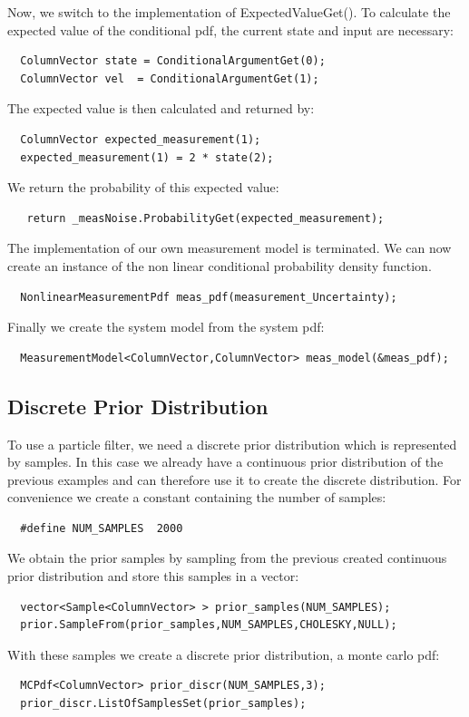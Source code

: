 \documentclass[a4paper,10pt]{report}
\begin{document}
Now, we switch to the implementation of ExpectedValueGet().  To
calculate the expected value of the conditional pdf, the current state
and input are necessary:
\begin{verbatim}
  ColumnVector state = ConditionalArgumentGet(0);
  ColumnVector vel  = ConditionalArgumentGet(1);
\end{verbatim}
The expected value is then calculated and returned by:
\begin{verbatim}
  ColumnVector expected_measurement(1);
  expected_measurement(1) = 2 * state(2);
\end{verbatim}
We return the probability of this expected value:
\begin{verbatim}
   return _measNoise.ProbabilityGet(expected_measurement);
\end{verbatim}
The implementation of our own measurement model is terminated. We can
now create an instance of the non linear conditional probability
density function.
\begin{verbatim}
  NonlinearMeasurementPdf meas_pdf(measurement_Uncertainty);
\end{verbatim}
Finally we create the system model from the system pdf:
\begin{verbatim}
  MeasurementModel<ColumnVector,ColumnVector> meas_model(&meas_pdf);
\end{verbatim}




\subsection{Discrete Prior Distribution}
To use a particle filter, we need a discrete prior distribution which
is represented by samples. In this case we already have a continuous
prior distribution of the previous examples and can therefore use it
to create the discrete distribution.  For convenience we create a
constant containing the number of samples:
\begin{verbatim}
  #define NUM_SAMPLES  2000 
\end{verbatim}
We obtain the prior samples by sampling from the previous created
continuous prior distribution and store this samples in a vector:
\begin{verbatim}
  vector<Sample<ColumnVector> > prior_samples(NUM_SAMPLES);
  prior.SampleFrom(prior_samples,NUM_SAMPLES,CHOLESKY,NULL); 
\end{verbatim}
With these samples we create a discrete prior distribution, a monte carlo pdf:
\begin{verbatim}
  MCPdf<ColumnVector> prior_discr(NUM_SAMPLES,3);
  prior_discr.ListOfSamplesSet(prior_samples);
\end{verbatim}
\end{document}
